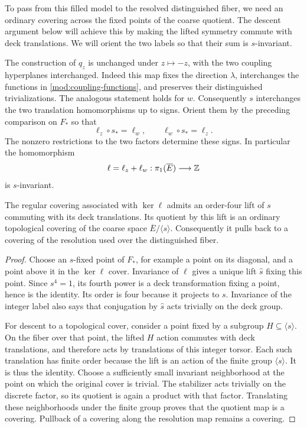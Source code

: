 To pass from this filled model to the resolved distinguished fiber,
we need an ordinary covering across the fixed points of the coarse
quotient.  The descent argument below will achieve this by making the
lifted symmetry commute with deck translations.  We will orient the
two labels so that their sum is $s$-invariant.

The construction of $q_z$ is unchanged under $z\mapsto-z$, with
the two coupling hyperplanes interchanged.  Indeed this map fixes
the direction $\lambda$, interchanges the functions in
\eqref{mod:coupling-functions}, and preserves their distinguished
trivializations.  The analogous statement holds for $w$.
Consequently $s$ interchanges the two translation homomorphisms up
to signs.  Orient them by the preceding comparison on $F_*$ so that
\[
 \ell_z\circ s_* =\ell_w,
 \qquad \ell_w\circ s_* =\ell_z.
\]
The nonzero restrictions to the two factors determine these signs.
In particular the homomorphism
\begin{equation}\label{mod:sum-label}
 \ell=\ell_z+\ell_w:\pi_1(\overline E)\longrightarrow\mathbb Z
\end{equation}
is $s$-invariant.

\begin{lemma}\label{mod:central}
The regular covering associated with $\ker\ell$ admits an order-four
lift of $s$ commuting with its deck translations.  Its quotient by
this lift is an ordinary topological covering of the coarse space
$\overline E/\langle s\rangle$.  Consequently it pulls back to a
covering of the resolution used over the distinguished fiber.
\end{lemma}
\begin{proof}
Choose an $s$-fixed point of $F_*$, for example a point on its
diagonal, and a point above it in the $\ker\ell$ cover.  Invariance
of $\ell$ gives a unique lift $\widehat s$ fixing this point.  Since
$s^4=1$, its fourth power is a deck transformation fixing a point,
hence is the identity.  Its order is four because it projects to
$s$.  Invariance of the integer label also says that conjugation
by $\widehat s$ acts trivially on the deck group.

For descent to a topological cover, consider a point fixed by a
subgroup $H\subseteq\langle s\rangle$.  On the fiber over that
point, the lifted $H$ action commutes with deck translations, and
therefore acts by translations of this integer torsor.  Each such
translation has finite order because the lift is an action of the
finite group $\langle s\rangle$.  It is thus the identity.  Choose
a sufficiently small invariant neighborhood at the point on which
the original cover is trivial.  The stabilizer acts trivially on
the discrete factor, so its quotient is again a product with that
factor.  Translating these neighborhoods under the finite group
proves that the quotient map is a covering.  Pullback of a covering
along the resolution map remains a covering.
\end{proof}

